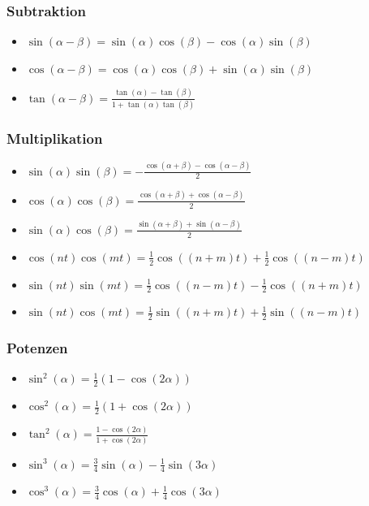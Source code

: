 \documentclass[a4paper,10pt]{article}
\begin{document}
\subsubsection{Subtraktion}
\begin{itemize}
 \item $\sin(\alpha - \beta) = \sin(\alpha) \cos(\beta) - \cos(\alpha)\sin(\beta)$
 \item $\cos(\alpha - \beta) = \cos(\alpha) \cos(\beta) + \sin(\alpha)\sin(\beta)$
 \item $\tan(\alpha - \beta) = \frac{\tan(\alpha) - \tan(\beta)}{1+\tan(\alpha) \tan(\beta)}$
\end{itemize}

\subsubsection{Multiplikation}
\begin{itemize}
 \item $\sin(\alpha) \sin(\beta) = -\frac{\cos(\alpha + \beta) - \cos(\alpha - \beta)}{2}$
 \item $\cos(\alpha) \cos(\beta) =  \frac{\cos(\alpha + \beta) + \cos(\alpha - \beta)}{2}$
 \item $\sin(\alpha) \cos(\beta) =  \frac{\sin(\alpha + \beta) + \sin(\alpha - \beta)}{2}$
 \item $\cos(nt)\cos(mt) =\frac12 \cos((n+m)t)+\frac12\cos((n-m)t)$
 \item $\sin(nt) \sin(mt) =\frac12\cos((n-m)t)-\frac12\cos((n+m)t)$
 \item $\sin(nt)\cos(mt) =\frac12\sin((n+m)t)+\frac12\sin((n-m)t)$
\end{itemize}

\subsubsection{Potenzen}
\begin{itemize}
 \item $\sin^2(\alpha) = \frac{1}{2}(1-\cos(2\alpha))$
 \item $\cos^2(\alpha) = \frac{1}{2}(1+\cos(2\alpha))$
 \item $\tan^2(\alpha) = \frac{1-\cos(2\alpha)}{1+\cos(2\alpha)}$
 \item $\sin^3(\alpha) = \frac{3}{4} \sin(\alpha) - \frac{1}{4} \sin(3 \alpha)$
 \item $\cos^3(\alpha) = \frac{3}{4} \cos(\alpha) + \frac{1}{4} \cos(3 \alpha)$
\end{itemize}
\end{document}
